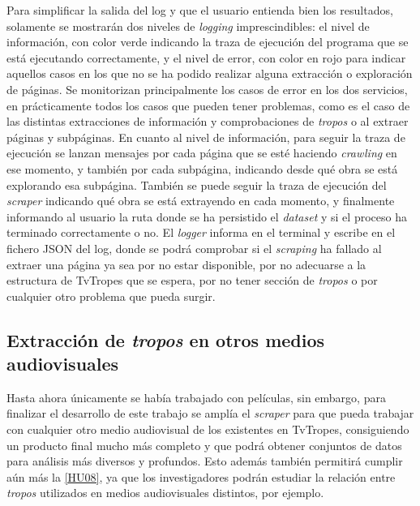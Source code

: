 Para simplificar la salida del log y que el usuario entienda bien los
resultados, solamente se mostrarán dos niveles de \textit{logging}
imprescindibles: el nivel de información, con color verde indicando la traza de
ejecución del programa que se está ejecutando correctamente, y el nivel de
error, con color en rojo para indicar aquellos casos en los que no se ha podido
realizar alguna extracción o exploración de páginas. Se monitorizan
principalmente los casos de error en los dos servicios, en prácticamente todos
los casos que pueden tener problemas, como es el caso de las distintas
extracciones de información y comprobaciones de \textit{tropos} o al extraer
páginas y subpáginas. En cuanto al nivel de información, para seguir la traza de
ejecución se lanzan mensajes por cada página que se esté haciendo
\textit{crawling} en ese momento, y también por cada subpágina, indicando desde
qué obra se está explorando esa subpágina. También se puede seguir la traza de
ejecución del \textit{scraper} indicando qué obra se está extrayendo en cada
momento, y finalmente informando al usuario la ruta donde se ha persistido el
\textit{dataset} y si el proceso ha terminado correctamente o no. El
\textit{logger} informa en el terminal y escribe en el fichero JSON del log,
donde se podrá comprobar si el \textit{scraping} ha fallado al extraer una
página ya sea por no estar disponible, por no adecuarse a la estructura de
TvTropes que se espera, por no tener sección de \textit{tropos} o por cualquier
otro problema que pueda surgir.

\subsection{Extracción de \textit{tropos} en otros medios audiovisuales} 

Hasta ahora únicamente se había trabajado con películas, sin embargo, para
finalizar el desarrollo de este trabajo se amplía el \textit{scraper} para que
pueda trabajar con cualquier otro medio audiovisual de los existentes en
TvTropes, consiguiendo un producto final mucho más completo y que podrá obtener
conjuntos de datos para análisis más diversos y profundos. Esto además también
permitirá cumplir aún más la
\href{https://github.com/jlgallego99/TropesToGo/issues/57}{[HU08]}, ya que los
investigadores podrán estudiar la relación entre \textit{tropos} utilizados en
medios audiovisuales distintos, por ejemplo.

